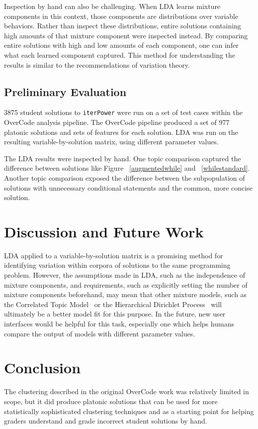 Inspection by hand can also be challenging. When LDA learns mixture components in this context, those components are distributions over variable behaviors. Rather than inspect these distributions, entire solutions containing high amounts of that mixture component were inspected instead. By comparing entire solutions with high and low amounts of each component, one can infer what each learned component captured. This method for understanding the results is similar to the recommendations of variation theory. 

\subsection{Preliminary Evaluation}
3875 student solutions to \texttt{iterPower} were run on a set of test cases within the OverCode analysis pipeline. The OverCode pipeline produced a set of 977 platonic solutions and sets of features for each solution. LDA was run on the resulting variable-by-solution matrix, using different parameter values.

The LDA results were inspected by hand. One topic comparison captured the difference between solutions like Figure ~\ref{augmentedwhile} and ~\ref{whilestandard}. Another topic comparison exposed the difference between the subpopulation of solutions with unnecessary conditional statements and the common, more concise solution. 

\section{Discussion and Future Work}

LDA applied to a variable-by-solution matrix is a promising method for identifying variation within corpora of solutions to the same programming problem. However, the assumptions made in LDA, such as the independence of mixture components, and requirements, such as explicitly setting the number of mixture components beforehand, may mean that other mixture models, such as the Correlated Topic Model~\cite{ctm} or the Hierarchical Dirichlet Process~\cite{hdp05} will ultimately be a better model fit for this purpose. In the future, new user interfaces would be helpful for this task, especially one which helps humans compare the output of models with different parameter values.



\section{Conclusion}
The clustering described in the original OverCode work was relatively limited in scope, but it did produce platonic solutions that can be used for more statistically sophisticated clustering techniques and as a starting point for helping graders understand and grade incorrect student solutions by hand.

